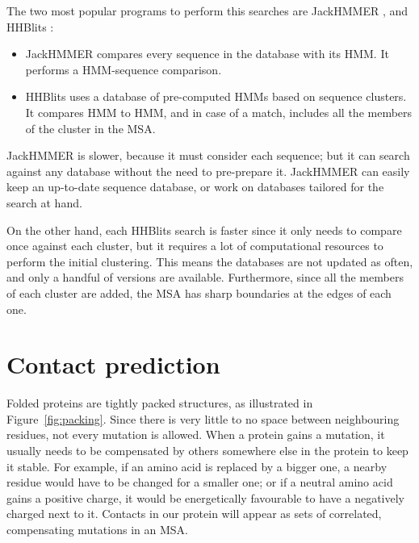 The two most popular programs to perform this searches are JackHMMER \citep{jh}, and HHBlits \citep{hhblits}:

\begin{itemize}
\item JackHMMER compares every sequence in the database with its HMM.
It performs a HMM-sequence comparison.
\item HHBlits uses a database of pre-computed HMMs based on sequence clusters.
It compares HMM to HMM, and in case of a match, includes all the members of the cluster in the MSA.
\end{itemize}

JackHMMER is slower, 
because it must consider each sequence; but it can search against any database without the need to pre-prepare it.
JackHMMER can easily keep an up-to-date sequence database, or work on databases tailored for the search at hand.

On the other hand, each HHBlits search is faster since it only needs to compare once against each cluster, but it requires a lot of computational resources to perform the initial clustering.
This means the databases are not updated as often, and only a handful of versions are available.
Furthermore, since all the members of each cluster are added, the MSA has sharp boundaries at the edges of each one.




\section{Contact prediction}
Folded proteins are tightly packed structures, as illustrated in Figure~\ref{fig:packing}.
Since there is very little to no space between neighbouring residues, not every mutation is allowed.
When a protein gains a mutation, it usually needs to be compensated by others somewhere else in the protein to keep it stable.
For example, if an amino acid is replaced by a bigger one, a nearby residue would have to be changed for a smaller one; or if a neutral amino acid gains a positive charge, it would be energetically favourable to have a negatively charged next to it.
Contacts in our protein will appear as sets of correlated, compensating mutations in an MSA.

